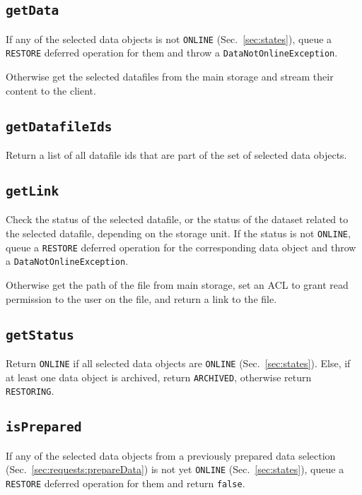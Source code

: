 \documentclass[paper=a4]{scrartcl}
\begin{document}
\subsection{\texttt{getData}}
\label{sec:requests:getdata}

If any of the selected data objects is not \texttt{ONLINE}
(Sec.~\ref{sec:states}), queue a \texttt{RESTORE} deferred operation
for them and throw a \texttt{DataNotOnlineException}.

Otherwise get the selected datafiles from the main storage and
stream their content to the client.

\subsection{\texttt{getDatafileIds}}

Return a list of all datafile ids that are part of the set of
selected data objects.

\subsection{\texttt{getLink}}
\label{sec:requests:getlink}

Check the status of the selected datafile, or the status of the
dataset related to the selected datafile, depending on the storage
unit.  If the status is not \texttt{ONLINE}, queue a \texttt{RESTORE}
deferred operation for the corresponding data object and throw a
\texttt{DataNotOnlineException}.

Otherwise get the path of the file from main storage, set an ACL to
grant read permission to the user on the file, and return a link to
the file.

\subsection{\texttt{getStatus}}

Return \texttt{ONLINE} if all selected data objects are
\texttt{ONLINE} (Sec.~\ref{sec:states}).  Else, if at least one data
object is archived, return \texttt{ARCHIVED}, otherwise return
\texttt{RESTORING}.

\subsection{\texttt{isPrepared}}

If any of the selected data objects from a previously prepared
data selection (Sec.~\ref{sec:requests:prepareData}) is not yet
\texttt{ONLINE} (Sec.~\ref{sec:states}), queue a \texttt{RESTORE}
deferred operation for them and return \texttt{false}.
\end{document}
